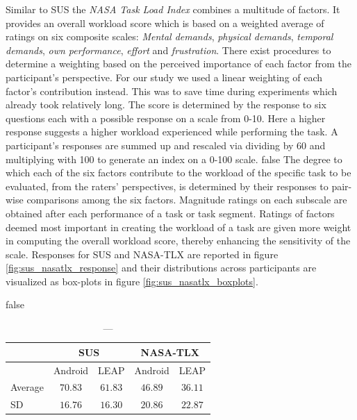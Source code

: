 Similar to SUS the \textit{NASA Task Load Index} combines a multitude of factors.
It provides an overall workload score which is based on a weighted average of ratings on six composite scales: 
\textit{Mental demands}, \textit{physical demands}, \textit{temporal demands}, \textit{own performance}, \textit{effort} and \textit{frustration}.
There exist procedures to determine a weighting based on the perceived importance of each factor from the participant's perspective.
For our study we used a linear weighting of each factor's contribution instead.
This was to save time during experiments which already took relatively long.
The score is determined by the response to six questions each with a possible response on a scale from 0-10.
Here a higher response suggests a higher workload experienced while performing the task.
A participant's responses are summed up and rescaled via dividing by 60 and multiplying with 100 to generate an index on a 0-100 scale.
\if false
The degree to which each of the six factors contribute to the workload of the specific task to be evaluated, from the raters' perspectives, is determined by their responses to pair-wise comparisons among the six factors.
Magnitude ratings on each subscale are obtained after each performance of a task or task segment. Ratings of factors deemed most important in creating the workload of a task are given more weight in computing the overall workload score, thereby enhancing the sensitivity of the scale.
\fi
Responses for SUS and NASA-TLX are reported in figure \ref{fig:sus_nasatlx_response} and their distributions across participants are visualized as box-plots in figure \ref{fig:sus_nasatlx_boxplots}.


\if false
\begin{table}[htbp]
    \centering
    \begin{tabular}{l|c c|c c}
    \toprule
    	{}	&	\multicolumn{2}{c}{SUS}	&	\multicolumn{2}{c}{NASA-TLX}\\
    \midrule
        {}	&	Android	&	LEAP	&	Android	& LEAP\\
        Average	&	$70.83$	& $61.83$	&	$46.89$	&	$36.11$\\
        SD	&	$16.76$	&	$16.30$	&	$20.86$	&	$22.87$\\
    \bottomrule
    \end{tabular}
    \caption{
    \textsf{---}
    }
    \label{table:sus_nasatlx}
\end{table}
\fi